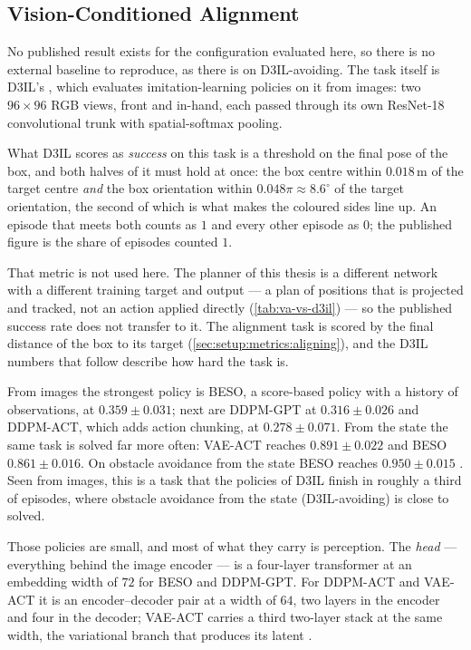 \subsection{Vision-Conditioned Alignment}\label{sec:setup:baselines:aligning}

No published result exists for the configuration evaluated here, so there is no external baseline to
reproduce, as there is on D3IL-avoiding. The task itself is D3IL's \parencite{jia2024towards}, which
evaluates imitation-learning policies on it from images: two $96\times96$ RGB views, front and in-hand,
each passed through its own ResNet-18 convolutional trunk with spatial-softmax pooling.

What D3IL scores as \emph{success} on this task is a threshold on the final pose of the box, and both
halves of it must hold at once: the box centre within $0.018$\,m of the target centre \emph{and} the box
orientation within $0.048\pi \approx 8.6^{\circ}$ of the target orientation, the second of which is what
makes the coloured sides line up. An episode that meets both counts as $1$ and every other episode as $0$;
the published figure is the share of episodes counted $1$.

That metric is not used here. The planner of this thesis is a different network with a different
training target and output --- a plan of positions that is projected and tracked, not an action applied
directly (\autoref{tab:va-vs-d3il}) --- so the published success rate does not transfer to it. The
alignment task is scored by the final distance of the box to its target
(\autoref{sec:setup:metrics:aligning}), and the D3IL numbers that follow describe how hard the task is.

From images the strongest policy is BESO, a
score-based policy with a history of observations, at $0.359\pm0.031$; next are DDPM-GPT at
$0.316\pm0.026$ and DDPM-ACT, which adds action chunking, at $0.278\pm0.071$. From the state the same task
is solved far more often: VAE-ACT reaches $0.891\pm0.022$ and BESO $0.861\pm0.016$. On obstacle avoidance
from the state BESO reaches $0.950\pm0.015$ \parencite[Table~3]{jia2024towards}. Seen from images, this is a
task that the policies of D3IL finish in roughly a third of episodes, where obstacle avoidance from the
state (D3IL-avoiding) is close to solved.

Those policies are small, and most of what they carry is perception. The \emph{head} --- everything behind
the image encoder --- is a four-layer transformer at an embedding width of $72$ for BESO and DDPM-GPT. For
DDPM-ACT and VAE-ACT it is an encoder--decoder pair at a width of $64$, two layers in the encoder and four
in the decoder; VAE-ACT carries a third two-layer stack at the same width, the variational branch that
produces its latent \parencite[Table~9]{jia2024towards}.

